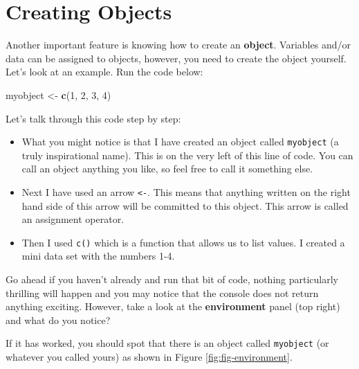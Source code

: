 \documentclass[
]{book}
\newenvironment{Shaded}{\begin{snugshade}}{\end{snugshade}}
\newcommand{\DecValTok}[1]{\textcolor[rgb]{0.00,0.00,0.81}{#1}}
\newcommand{\FunctionTok}[1]{\textcolor[rgb]{0.13,0.29,0.53}{\textbf{#1}}}
\newcommand{\NormalTok}[1]{#1}
\newcommand{\OtherTok}[1]{\textcolor[rgb]{0.56,0.35,0.01}{#1}}
\let\oldsection\section
\renewcommand{\section}{\needspace{5\baselineskip}\oldsection}
\begin{document}
\section{Creating Objects}\label{creating-objects}

Another important feature is knowing how to create an \textbf{object}. Variables and/or data can be assigned to objects, however, you need to create the object yourself. Let's look at an example. Run the code below:

\begin{Shaded}
\begin{Highlighting}[]
\NormalTok{myobject }\OtherTok{\textless{}{-}} \FunctionTok{c}\NormalTok{(}\DecValTok{1}\NormalTok{, }\DecValTok{2}\NormalTok{, }\DecValTok{3}\NormalTok{, }\DecValTok{4}\NormalTok{)}
\end{Highlighting}
\end{Shaded}

Let's talk through this code step by step:

\begin{itemize}
\item
  What you might notice is that I have created an object called \texttt{myobject} (a truly inspirational name). This is on the very left of this line of code. You can call an object anything you like, so feel free to call it something else.
\item
  Next I have used an arrow \texttt{\textless{}-}. This means that anything written on the right hand side of this arrow will be committed to this object. This arrow is called an assignment operator.
\item
  Then I used \texttt{c()} which is a function that allows us to list values. I created a mini data set with the numbers 1-4.
\end{itemize}

Go ahead if you haven't already and run that bit of code, nothing particularly thrilling will happen and you may notice that the console does not return anything exciting. However, take a look at the \textbf{environment} panel (top right) and what do you notice?

If it has worked, you should spot that there is an object called \texttt{myobject} (or whatever you called yours) as shown in Figure \ref{fig:fig-environment}.
\end{document}
